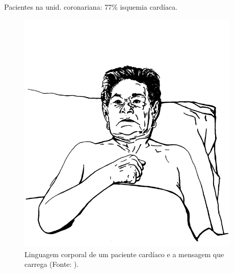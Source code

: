 \begin{frame}
    \frametitle{}
    Pacientes na unid. coronariana: 77\% isquemia cardíaca.
    \begin{figure}[!ht]
        \centering
        \caption{Linguagem corporal de um paciente cardíaco 
        e a mensagem que carrega (Fonte: \textcite{Edmondstone1995CardiacCP}).}
        \begin{minipage}[t]{0.24\textwidth}
          \includegraphics[width=0.95\textwidth]{images/cardiac1.jpg}
        \end{minipage}
        \hfill
        \begin{minipage}[t]{0.24\textwidth}

\end{minipage}
\end{figure}
\end{frame}
